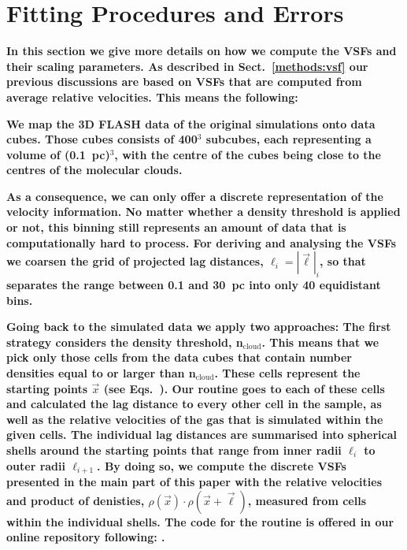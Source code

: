 \section{Fitting Procedures and Errors}\label{appFitting}

\textbf{
    In this section we give more details on how we compute the VSFs and their scaling parameters.
    As described in Sect.~\ref{methods:vsf} our previous discussions are based on VSFs that are computed from average relative velocities. 
    This means the following:
}

\textbf{ 
    We map the 3D FLASH data of the original simulations  onto data cubes. 
    Those cubes consists of 400$^3$ subcubes, each representing a volume of (0.1~pc)$^3$, with the centre of the cubes being close to the centres of the molecular clouds. 
}

\textbf{
    As a consequence, we can only offer a discrete representation of the velocity information. 
    No matter whether a density threshold is applied or not, this binning still represents an amount of data that is computationally hard to process.
    For deriving and analysing the VSFs we coarsen the grid of projected lag distances, $\ell_i = |\vec{\ell}|_i$, so that separates the range between 0.1 and 30~pc into only 40 equidistant bins.
}

\textbf{
    Going back to the simulated data we apply two approaches: 
    The first strategy considers the density threshold, n$_\mathrm{cloud}$.
    This means that we pick only those cells from the data cubes that contain number densities equal to or larger than n$_\mathrm{cloud}$.
    These cells represent the starting points $\vec{x}$ (see Eqs.~).
    Our routine goes to each of these cells and calculated the lag distance to every other cell in the sample, as well as the relative velocities of the gas that is simulated within the given cells. 
    The individual lag distances are summarised into spherical shells around the starting points that range from inner radii $\ell_{i}$ to outer radii $\ell_{i+1}$. 
    By doing so, we compute the discrete VSFs presented in the main part of this paper with the relative velocities and product of denisties, $\rho(\vec{x}) \cdot \rho(\vec{x}+\vec{\ell})$, measured from cells within the individual shells.
    The code for the routine is offered in our online repository following: .
}

